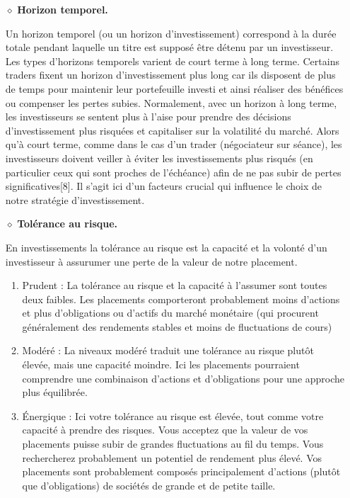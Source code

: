 \begin{itemize}
	\item[$\diamond$]\textbf{Horizon temporel.}
	\par{
		Un horizon temporel (ou un horizon d'investissement) correspond à la durée totale pendant    laquelle un titre est supposé être détenu par un investisseur. 
		Les types d'horizons temporels varient de court terme à long terme. Certains traders fixent 
		un horizon d'investissement plus long car ils disposent de plus de temps pour maintenir 
		leur portefeuille investi et ainsi réaliser des bénéfices ou compenser les pertes subies. 
		Normalement, avec un horizon à long terme, les investisseurs se sentent plus à l'aise pour 
		prendre des décisions d'investissement plus risquées et capitaliser sur la volatilité 
		du marché. Alors qu'à court terme, comme dans le cas d'un trader (négociateur sur séance),
			les investisseurs doivent veiller à éviter les investissements plus risqués (en particulier 
			ceux qui sont proches de l'échéance) afin de ne pas subir de pertes significatives[8].
		Il s'agit ici d'un facteurs crucial qui influence le choix de notre stratégie d'investissement.
		
	
	}
	
	\item[$\diamond$]\textbf{Tolérance au risque.}
	\par{
	En investissements la tolérance au risque est la capacité et la volonté d'un investisseur à 
	assurumer une perte de la valeur de notre placement. }

	\begin{enumerate}
		\item Prudent : 
		La tolérance au risque et la capacité à l'assumer sont toutes deux faibles. 
		Les placements comporteront probablement moins d'actions et plus d'obligations ou 
		d'actifs du marché monétaire (qui procurent généralement des rendements stables et 
		moins de fluctuations de cours)

		\item Modéré : 
		La niveaux modéré traduit une tolérance au risque plutôt élevée, 
		mais une capacité moindre. Ici les placements pourraient comprendre une combinaison 
		d'actions et d'obligations pour une approche plus équilibrée. 

		\item Énergique : 
		Ici votre tolérance au risque est élevée, tout comme votre capacité 
		à prendre des risques. Vous acceptez que la valeur de vos placements puisse 
		subir de grandes fluctuations au fil du temps. Vous rechercherez probablement 
		un potentiel de rendement plus élevé. Vos placements sont probablement 
		composés principalement d'actions (plutôt que d'obligations) de sociétés de 
		grande et de petite taille. 

	\end{enumerate}	
\end{itemize}


